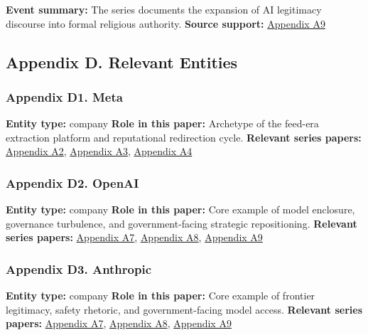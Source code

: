 \documentclass[
  american,
  11pt,
  letterpaper,
]{article}
\begin{document}
\textbf{Event summary:} The series documents the expansion of AI
legitimacy discourse into formal religious authority. \textbf{Source
support:}
\hyperref[appendix-a9-chapter-08-power-network-legitimacy-and-institutional-capture]{Appendix
A9}

\subsection{Appendix D. Relevant
Entities}\label{appendix-d.-relevant-entities}

\subsubsection{Appendix D1. Meta}\label{appendix-d1.-meta}

\textbf{Entity type:} company \textbf{Role in this paper:} Archetype of
the feed-era extraction platform and reputational redirection cycle.
\textbf{Relevant series papers:}
\hyperref[appendix-a2-chapter-01-social-networks-as-infrastructure-for-free-data-capture]{Appendix
A2},
\hyperref[appendix-a3-chapter-02-social-erosion-and-moral-reconfiguration]{Appendix
A3},
\hyperref[appendix-a4-chapter-03-covid-as-a-historical-accelerator]{Appendix
A4}

\subsubsection{Appendix D2. OpenAI}\label{appendix-d2.-openai}

\textbf{Entity type:} company \textbf{Role in this paper:} Core example
of model enclosure, governance turbulence, and government-facing
strategic repositioning. \textbf{Relevant series papers:}
\hyperref[appendix-a7-chapter-06-ai-as-a-dual-use-rhetorical-weapon]{Appendix
A7},
\hyperref[appendix-a8-chapter-07-imperial-control-over-access]{Appendix
A8},
\hyperref[appendix-a9-chapter-08-power-network-legitimacy-and-institutional-capture]{Appendix
A9}

\subsubsection{Appendix D3. Anthropic}\label{appendix-d3.-anthropic}

\textbf{Entity type:} company \textbf{Role in this paper:} Core example
of frontier legitimacy, safety rhetoric, and government-facing model
access. \textbf{Relevant series papers:}
\hyperref[appendix-a7-chapter-06-ai-as-a-dual-use-rhetorical-weapon]{Appendix
A7},
\hyperref[appendix-a8-chapter-07-imperial-control-over-access]{Appendix
A8},
\hyperref[appendix-a9-chapter-08-power-network-legitimacy-and-institutional-capture]{Appendix
A9}
\end{document}
